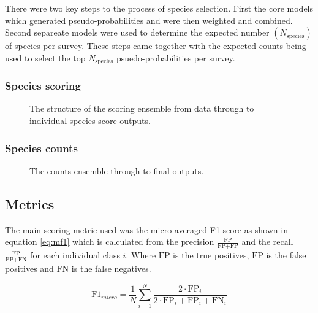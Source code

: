 \newcommand{\nspecies}{N_{\text{species}}}

There were two key steps to the process of species selection. First the core models which generated pseudo-probabilities and were then weighted and combined. 
Second separeate models were used to determine the expected number $(\nspecies)$ of species per survey. 
These steps came together with the expected counts being used to select the top  $\nspecies$ psuedo-probabilities per survey.

\subsubsection{Species scoring}
\begin{figure}
    \begin{center}
        
        \caption{The structure of the scoring ensemble from data through to individual species score outputs.}
    \end{center}\label{fig:score-structure}
\end{figure}
\subsubsection{Species counts}
\begin{figure}
    \begin{center}
        
        \caption{The counts ensemble through to final outputs.}
    \end{center}\label{fig:count-structure}
\end{figure}
\subsection{Metrics}

\newcommand{\fp}{\text{FP}}
\newcommand{\fn}{\text{FN}}
\newcommand{\tp}{\text{FP}}

The main scoring metric used was the micro-averaged F1 score as shown in equation \ref{eq:mf1} which is calculated from the precision $\frac{\tp}{\tp + \fp}$ and the recall $\frac{\tp}{\tp + \fn}$ for each individual class $i$. 
Where $\tp$ is the true positives, $\fp$ is the false positives and $\fn$ is the false negatives.

\begin{equation}\label{eq:mf1}
    \text{F1}_{micro} = \frac{1}{N}\sum_{i=1}^N\frac{2 \cdot \tp_i}{2 \cdot \tp_i + \fp_i + \fn_i}
\end{equation}
